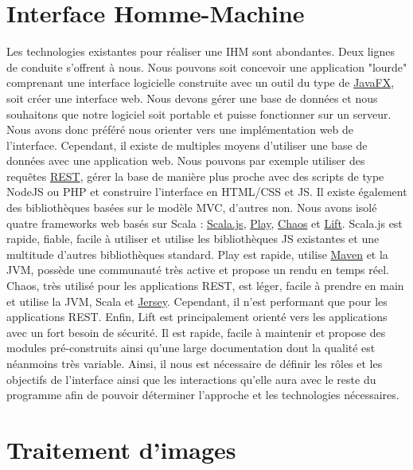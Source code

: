 \section{Interface Homme-Machine}

Les technologies existantes pour réaliser une IHM sont abondantes. Deux lignes de conduite s'offrent à nous. Nous pouvons
soit concevoir une application "lourde" comprenant une interface logicielle construite avec un outil du type de
\href{https://fr.wikipedia.org/wiki/JavaFX}{JavaFX}, soit créer une interface web. Nous devons gérer une base de données et
nous souhaitons que notre logiciel soit portable et puisse fonctionner sur un serveur. Nous avons donc préféré nous orienter
vers une implémentation web de l'interface. Cependant, il existe de multiples moyens d'utiliser une base de données avec une
application web. Nous pouvons par exemple utiliser des requêtes \href{https://en.wikipedia.org/wiki/Representational_state_transfer}{REST},
gérer la base de manière plus proche avec des scripts de type NodeJS ou PHP et construire l'interface en HTML/CSS et JS.
Il existe également des bibliothèques basées sur le modèle MVC, d'autres non. Nous avons isolé quatre frameworks web basés sur Scala :
\href{http://www.scala-js.org/}{Scala.js}, \href{https://www.playframework.com/}{Play},
\href{https://sourceforge.net/p/chaosuiframework/wiki/Home/}{Chaos} et \href{https://www.liftweb.net/}{Lift}. Scala.js est rapide,
fiable, facile à utiliser et utilise les bibliothèques JS existantes et une multitude d'autres bibliothèques standard.
Play est rapide, utilise \href{http://maven.apache.org/}{Maven} et la JVM, possède une communauté très active et propose un
rendu en temps réel. Chaos, très utilisé pour les applications REST, est léger, facile à prendre en main et utilise la JVM,
Scala et \href{https://jersey.github.io/}{Jersey}. Cependant, il n'est performant que pour les applications REST.
Enfin, Lift est principalement orienté vers les applications avec un fort besoin de sécurité. Il est rapide, facile à maintenir et
propose des modules pré-construits ainsi qu'une large documentation dont la qualité est néanmoins très variable. Ainsi, il nous
est nécessaire de définir les rôles et les objectifs de l'interface ainsi que les interactions qu'elle aura avec le reste du
programme afin de pouvoir déterminer l'approche et les technologies nécessaires.

\section{Traitement d'images}

